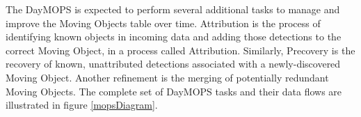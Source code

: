 The DayMOPS is expected to perform several additional tasks to manage
and improve the Moving Objects table over time.  Attribution is the
process of identifying known objects in incoming data and adding those
detections to the correct Moving Object, in a process called
Attribution. Similarly, Precovery is the recovery of known,
unattributed detections associated with a newly-discovered Moving
Object.  Another refinement is the merging of potentially redundant
Moving Objects.  The complete set of DayMOPS tasks and their data
flows are illustrated in figure \ref{mopsDiagram}.




